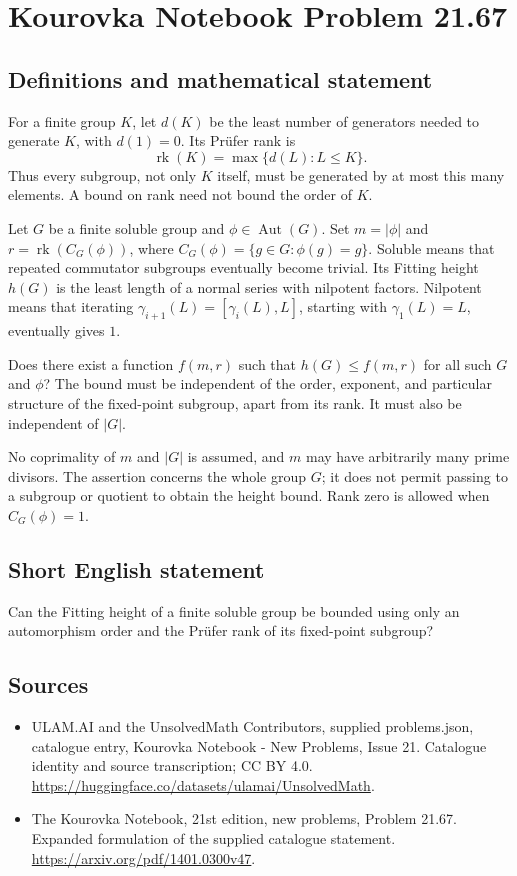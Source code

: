 \documentclass[11pt,a4paper]{article}
\begin{document}
\section*{Kourovka Notebook Problem 21.67}\label{statement}

\subsection{Definitions and mathematical statement}
For a finite group $K$, let $d(K)$ be the least number of generators
needed to generate $K$, with $d(1)=0$. Its Pr\"ufer rank is
\[
 \operatorname{rk}(K)=\max\{d(L):L\le K\}.
\]
Thus every subgroup, not only $K$ itself, must be generated by at most
this many elements. A bound on rank need not bound the order of $K$.

Let $G$ be a finite soluble group and $\phi\in\operatorname{Aut}(G)$.
Set $m=|\phi|$ and
$r=\operatorname{rk}(C_G(\phi))$, where
$C_G(\phi)=\{g\in G:\phi(g)=g\}$.
Soluble means that repeated commutator subgroups eventually become
trivial. Its Fitting height $h(G)$ is the least length of a normal
series with nilpotent factors. Nilpotent means that iterating
$\gamma_{i+1}(L)=[\gamma_i(L),L]$, starting with $\gamma_1(L)=L$,
eventually gives $1$.

Does there exist a function $f(m,r)$ such that
$h(G)\le f(m,r)$ for all such $G$ and $\phi$?
The bound must be independent of the order, exponent, and particular
structure of the fixed-point subgroup, apart from its rank. It must
also be independent of $|G|$.

No coprimality of $m$ and $|G|$ is assumed, and $m$ may have arbitrarily
many prime divisors. The assertion concerns the whole group $G$; it
does not permit passing to a subgroup or quotient to obtain the
height bound. Rank zero is allowed when $C_G(\phi)=1$.
\subsection{Short English statement}
Can the Fitting height of a finite soluble group be bounded using only an automorphism order and the Prüfer rank of its fixed-point subgroup?
\subsection{Sources}
\begin{itemize}
\item[S1] ULAM.AI and the UnsolvedMath Contributors, supplied problems.json, catalogue entry, Kourovka Notebook - New Problems, Issue 21. Catalogue identity and source transcription; CC BY 4.0.
\url{https://huggingface.co/datasets/ulamai/UnsolvedMath}.
\item[S2] The Kourovka Notebook, 21st edition, new problems, Problem 21.67. Expanded formulation of the supplied catalogue statement.
\url{https://arxiv.org/pdf/1401.0300v47}.
\end{itemize}
\end{document}
